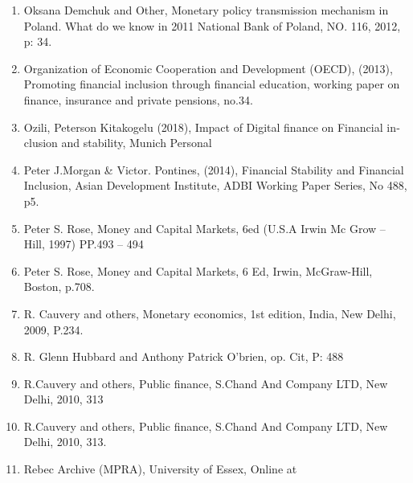 \documentclass[10pt,a4paper]{report}
\begin{document}
\begin{english}
\begin{enumerate}
	\item Oksana Demchuk and Other, Monetary policy transmission mechanism in Poland. What do we know in 2011 National Bank of Poland, NO. 116, 2012, p: 34.
	\item Organization of Economic Cooperation and Development (OECD), (2013), Promoting financial inclusion through financial education, working paper on finance, insurance and private pensions, no.34.
	\item Ozili, Peterson Kitakogelu (2018), Impact of Digital finance on Financial inclusion and stability, Munich Personal
	\item Peter J.Morgan \& Victor. Pontines, (2014), Financial Stability and Financial Inclusion, Asian Development Institute, ADBI Working Paper Series, No 488, p5.
	\item Peter S. Rose, Money and Capital Markets, 6ed (U.S.A Irwin Mc Grow – Hill, 1997) PP.493 – 494
	\item Peter S. Rose, Money and Capital Markets, 6 Ed, Irwin, McGraw-Hill, Boston, p.708.
	\item R. Cauvery and others, Monetary economics, 1st edition, India, New Delhi, 2009, P.234.
	\item R. Glenn Hubbard and Anthony Patrick O'brien, op. Cit, P: 488
	\item R.Cauvery and others, Public finance, S.Chand And Company LTD, New Delhi, 2010, 313
	\item R.Cauvery and others, Public finance, S.Chand And Company LTD, New Delhi, 2010, 313.
	\item Rebec Archive (MPRA), University of Essex, Online at
	

\end{enumerate}
\end{english}
\end{document}
